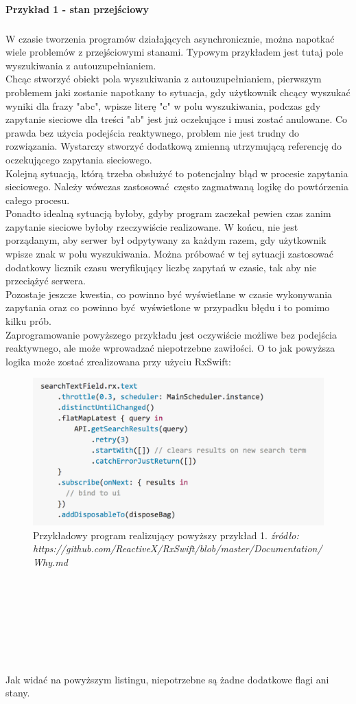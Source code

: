 \documentclass[12pt,oneside,a4paper]{report}
\begin{document}
\paragraph{Przykład 1 - stan przejściowy}
\subparagraph{}W czasie tworzenia programów działających asynchronicznie, można napotkać wiele problemów z przejściowymi stanami. Typowym przykładem jest tutaj pole wyszukiwania z autouzupełnianiem.\\
Chcąc stworzyć obiekt pola wyszukiwania z autouzupełnianiem, pierwszym problemem jaki zostanie napotkany to sytuacja, gdy użytkownik chcący wyszukać wyniki dla frazy "abc", wpisze literę "c" w polu wyszukiwania, podczas gdy zapytanie sieciowe dla treści "ab" jest już oczekujące i musi zostać anulowane. Co prawda bez użycia podejścia reaktywnego, problem nie jest trudny do rozwiązania. Wystarczy stworzyć dodatkową zmienną utrzymującą referencję do oczekującego zapytania sieciowego.\\
Kolejną sytuacją, którą trzeba obsłużyć to potencjalny błąd w procesie zapytania sieciowego. Należy wówczas zastosować często zagmatwaną logikę do powtórzenia całego procesu.\\
Ponadto idealną sytuacją byłoby, gdyby program zaczekał pewien czas zanim zapytanie sieciowe byłoby rzeczywiście realizowane. W końcu, nie jest porządanym, aby serwer był odpytywany za każdym razem, gdy użytkownik wpisze znak w polu wyszukiwania. Można próbować w tej sytuacji zastosować dodatkowy licznik czasu weryfikujący liczbę zapytań w czasie, tak aby nie przeciążyć serwera.\\
Pozostaje jeszcze kwestia, co powinno być wyświetlane w czasie wykonywania zapytania oraz co powinno być wyświetlone w przypadku błędu i to pomimo kilku prób.\\
Zaprogramowanie powyższego przykładu jest oczywiście możliwe bez podejścia reaktywnego, ale może wprowadzać niepotrzebne zawiłości.
O to jak powyższa logika może zostać zrealizowana przy użyciu RxSwift:
\begin{figure}[ht!]
	\centering
	\includegraphics[width=15cm]{transientState}
	\caption{Przykładowy program realizujący powyższy przykład 1. 
	 \textit{źródło: https://github.com/ReactiveX/RxSwift/blob/master/Documentation/Why.md}}
	\label{transientState}
\end{figure}
\\\\\\\\\\\\\\
Jak widać na powyższym listingu, niepotrzebne są żadne dodatkowe flagi ani stany.
\end{document}
